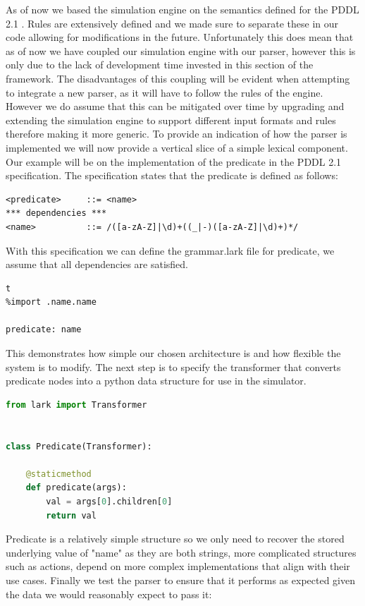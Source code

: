 As of now we based the simulation engine on the semantics defined for the PDDL 2.1 \cite{pddl21:online}. Rules are extensively defined and we made sure to separate these in our code allowing for modifications in the future. Unfortunately this does mean that as of now we have coupled our simulation engine with our parser, however this is only due to the lack of development time invested in this section of the framework. The disadvantages of this coupling will be evident when attempting to integrate a new parser, as it will have to follow the rules of the engine. However we do assume that this can be mitigated over time by upgrading and extending the simulation engine to support different input formats and rules therefore making it more generic.
\newpage
To provide an indication of how the parser is implemented we will now provide a vertical slice of a simple lexical component. Our example will be on the implementation of the predicate in the PDDL 2.1 specification. The specification states that the predicate is defined as follows:
\begin{lstlisting}
<predicate>     ::= <name>
*** dependencies ***
<name>          ::= /([a-zA-Z]|\d)+((_|-)([a-zA-Z]|\d)+)*/
\end{lstlisting}
With this specification we can define the grammar.lark file for predicate, we assume that all dependencies are satisfied.

\begin{lstlisting}t
%import .name.name

predicate: name
\end{lstlisting}
This demonstrates how simple our chosen architecture is and how flexible the system is to modify. The next step is to specify the transformer that converts predicate nodes into a python data structure for use in the simulator.

\begin{lstlisting}[language=Python]
from lark import Transformer


class Predicate(Transformer):

    @staticmethod
    def predicate(args):
        val = args[0].children[0]
        return val

\end{lstlisting}
Predicate is a relatively simple structure so we only need to recover the stored underlying value of "name" as they are both strings, more complicated structures such as actions, depend on more complex implementations that align with their use cases.
Finally we test the parser to ensure that it performs as expected given the data we would reasonably expect to pass it:



